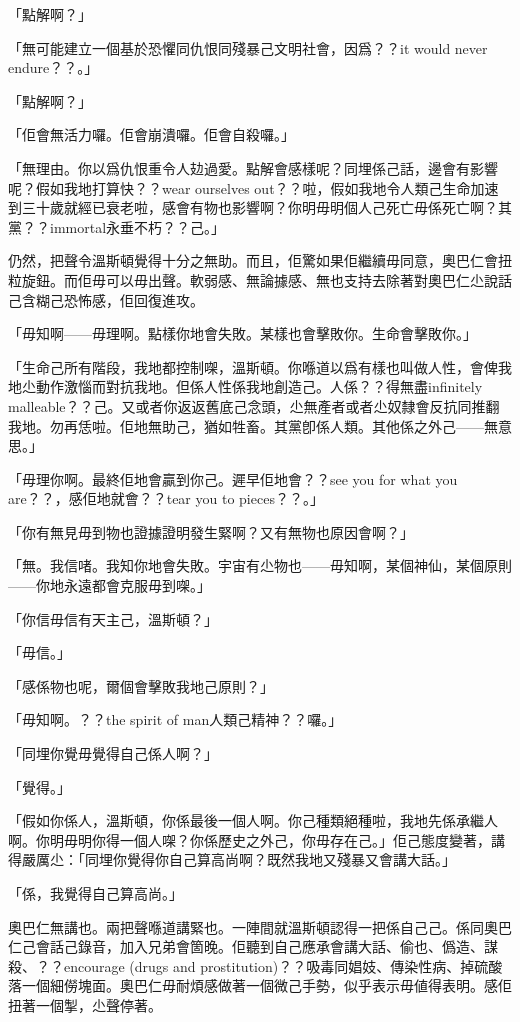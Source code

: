 「點解啊？」

「無可能建立一個基於恐懼同仇恨同殘暴己文明社會，因爲？？it would never endure？？。」

「點解啊？」

「佢會無活力囉。佢會崩潰囉。佢會自殺囉。」

「無理由。你以爲仇恨重令人攰過愛。點解會感樣呢？同埋係己話，邊會有影響呢？假如我地打算快？？wear ourselves out？？啦，假如我地令人類己生命加速到三十歲就經已衰老啦，感會有物也影響啊？你明毋明個人己死亡毋係死亡啊？其黨？？immortal永垂不朽？？己。」

仍然，把聲令溫斯頓覺得十分之無助。而且，佢驚如果佢繼續毋同意，奧巴仁會扭粒旋鈕。而佢毋可以毋出聲。軟弱感、無論據感、無也支持去除著對奧巴仁尐說話己含糊己恐怖感，佢回復進攻。

「毋知啊——毋理啊。點樣你地會失敗。某樣也會擊敗你。生命會擊敗你。」

「生命己所有階段，我地都控制㗎，溫斯頓。你喺道以爲有樣也叫做人性，會俾我地尐動作激惱而對抗我地。但係人性係我地創造己。人係？？得無盡infinitely malleable？？己。又或者你返返舊底己念頭，尐無產者或者尐奴隸會反抗同推翻我地。勿再恁啦。佢地無助己，猶如牲畜。其黨卽係人類。其他係之外己——無意思。」

「毋理你啊。最終佢地會贏到你己。遲早佢地會？？see you for what you are？？，感佢地就會？？tear you to pieces？？。」

「你有無見毋到物也證據證明發生緊啊？又有無物也原因會啊？」

「無。我信啫。我知你地會失敗。宇宙有尐物也——毋知啊，某個神仙，某個原則——你地永遠都會克服毋到㗎。」

「你信毋信有天主己，溫斯頓？」

「毋信。」

「感係物也呢，爾個會擊敗我地己原則？」

「毋知啊。？？the spirit of man人類己精神？？囉。」

「同埋你覺毋覺得自己係人啊？」

「覺得。」

「假如你係人，溫斯頓，你係最後一個人啊。你己種類絕種啦，我地先係承繼人啊。你明毋明你得一個人㗎？你係歷史之外己，你毋存在己。」佢己態度變著，講得嚴厲尐：「同埋你覺得你自己算高尚啊？既然我地又殘暴又會講大話。」

「係，我覺得自己算高尚。」

奧巴仁無講也。兩把聲喺道講緊也。一陣間就溫斯頓認得一把係自己己。係同奧巴仁己會話己錄音，加入兄弟會箇晚。佢聽到自己應承會講大話、偷也、僞造、謀殺、？？encourage (drugs and prostitution)？？吸毒同娼妓、傳染性病、掉硫酸落一個細僗塊面。奧巴仁毋耐煩感做著一個微己手勢，似乎表示毋値得表明。感佢扭著一個掣，尐聲停著。

